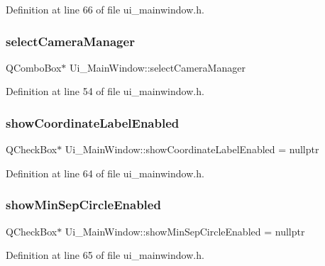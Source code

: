 Definition at line 66 of file ui\+\_\+mainwindow.\+h.

\mbox{\label{class_ui___main_window_aef0eeab19f2137affd96e9072b5946f1}} 
\subsubsection{\texorpdfstring{selectCameraManager}{selectCameraManager}}
{\footnotesize\ttfamily Q\+Combo\+Box$\ast$ Ui\+\_\+\+Main\+Window\+::select\+Camera\+Manager}



Definition at line 54 of file ui\+\_\+mainwindow.\+h.

\mbox{\label{class_ui___main_window_ae3adfcd6418482ab1b1a3174ef57eabf}} 
\subsubsection{\texorpdfstring{showCoordinateLabelEnabled}{showCoordinateLabelEnabled}}
{\footnotesize\ttfamily Q\+Check\+Box$\ast$ Ui\+\_\+\+Main\+Window\+::show\+Coordinate\+Label\+Enabled = nullptr}



Definition at line 64 of file ui\+\_\+mainwindow.\+h.

\mbox{\label{class_ui___main_window_a43638134544549986252295422f16cc0}} 
\subsubsection{\texorpdfstring{showMinSepCircleEnabled}{showMinSepCircleEnabled}}
{\footnotesize\ttfamily Q\+Check\+Box$\ast$ Ui\+\_\+\+Main\+Window\+::show\+Min\+Sep\+Circle\+Enabled = nullptr}



Definition at line 65 of file ui\+\_\+mainwindow.\+h.

